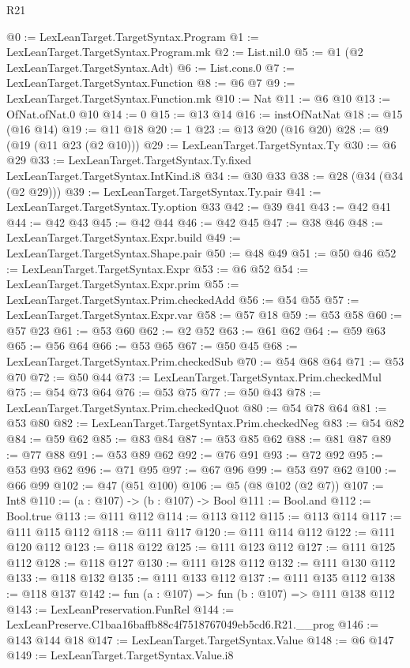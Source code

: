\begin{lexlean}{R21}
\begin{coremodule}
@0 := LexLeanTarget.TargetSyntax.Program
@1 := LexLeanTarget.TargetSyntax.Program.mk
@2 := List.nil.{0}
@5 := @1 (@2 LexLeanTarget.TargetSyntax.Adt)
@6 := List.cons.{0}
@7 := LexLeanTarget.TargetSyntax.Function
@8 := @6 @7
@9 := LexLeanTarget.TargetSyntax.Function.mk
@10 := Nat
@11 := @6 @10
@13 := OfNat.ofNat.{0} @10
@14 := 0
@15 := @13 @14
@16 := instOfNatNat
@18 := @15 (@16 @14)
@19 := @11 @18
@20 := 1
@23 := @13 @20 (@16 @20)
@28 := @9 (@19 (@11 @23 (@2 @10)))
@29 := LexLeanTarget.TargetSyntax.Ty
@30 := @6 @29
@33 := LexLeanTarget.TargetSyntax.Ty.fixed LexLeanTarget.TargetSyntax.IntKind.i8
@34 := @30 @33
@38 := @28 (@34 (@34 (@2 @29)))
@39 := LexLeanTarget.TargetSyntax.Ty.pair
@41 := LexLeanTarget.TargetSyntax.Ty.option @33
@42 := @39 @41
@43 := @42 @41
@44 := @42 @43
@45 := @42 @44
@46 := @42 @45
@47 := @38 @46
@48 := LexLeanTarget.TargetSyntax.Expr.build
@49 := LexLeanTarget.TargetSyntax.Shape.pair
@50 := @48 @49
@51 := @50 @46
@52 := LexLeanTarget.TargetSyntax.Expr
@53 := @6 @52
@54 := LexLeanTarget.TargetSyntax.Expr.prim
@55 := LexLeanTarget.TargetSyntax.Prim.checkedAdd
@56 := @54 @55
@57 := LexLeanTarget.TargetSyntax.Expr.var
@58 := @57 @18
@59 := @53 @58
@60 := @57 @23
@61 := @53 @60
@62 := @2 @52
@63 := @61 @62
@64 := @59 @63
@65 := @56 @64
@66 := @53 @65
@67 := @50 @45
@68 := LexLeanTarget.TargetSyntax.Prim.checkedSub
@70 := @54 @68 @64
@71 := @53 @70
@72 := @50 @44
@73 := LexLeanTarget.TargetSyntax.Prim.checkedMul
@75 := @54 @73 @64
@76 := @53 @75
@77 := @50 @43
@78 := LexLeanTarget.TargetSyntax.Prim.checkedQuot
@80 := @54 @78 @64
@81 := @53 @80
@82 := LexLeanTarget.TargetSyntax.Prim.checkedNeg
@83 := @54 @82
@84 := @59 @62
@85 := @83 @84
@87 := @53 @85 @62
@88 := @81 @87
@89 := @77 @88
@91 := @53 @89 @62
@92 := @76 @91
@93 := @72 @92
@95 := @53 @93 @62
@96 := @71 @95
@97 := @67 @96
@99 := @53 @97 @62
@100 := @66 @99
@102 := @47 (@51 @100)
@106 := @5 (@8 @102 (@2 @7))
@107 := Int8
@110 := (a : @107) -> (b : @107) -> Bool
@111 := Bool.and
@112 := Bool.true
@113 := @111 @112
@114 := @113 @112
@115 := @113 @114
@117 := @111 @115 @112
@118 := @111 @117
@120 := @111 @114 @112
@122 := @111 @120 @112
@123 := @118 @122
@125 := @111 @123 @112
@127 := @111 @125 @112
@128 := @118 @127
@130 := @111 @128 @112
@132 := @111 @130 @112
@133 := @118 @132
@135 := @111 @133 @112
@137 := @111 @135 @112
@138 := @118 @137
@142 := fun (a : @107) => fun (b : @107) => @111 @138 @112
@143 := LexLeanPreservation.FunRel
@144 := LexLeanPreserve.C1baa16baffb88c4f7518767049eb5cd6.R21.__prog
@146 := @143 @144 @18
@147 := LexLeanTarget.TargetSyntax.Value
@148 := @6 @147
@149 := LexLeanTarget.TargetSyntax.Value.i8

\end{coremodule}
\end{lexlean}

